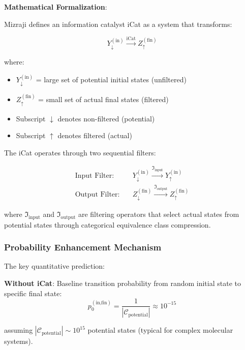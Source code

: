 \documentclass[11pt,a4paper]{article}
\begin{document}
\textbf{Mathematical Formalization}:

Mizraji defines an information catalyst iCat as a system that transforms:

\begin{equation}
Y_{\downarrow}^{(\text{in})} \xrightarrow{\text{iCat}} Z_{\uparrow}^{(\text{fin})}
\end{equation}

where:
\begin{itemize}
\item $Y_{\downarrow}^{(\text{in})}$ = large set of potential initial states (unfiltered)
\item $Z_{\uparrow}^{(\text{fin})}$ = small set of actual final states (filtered)  
\item Subscript $\downarrow$ denotes non-filtered (potential)
\item Subscript $\uparrow$ denotes filtered (actual)
\end{itemize}

The iCat operates through two sequential filters\cite{mizraji2021biological}:

\begin{align}
\text{Input Filter}: \quad & Y_{\downarrow}^{(\text{in})} \xrightarrow{\Im_{\text{input}}} Y_{\uparrow}^{(\text{in})} \\
\text{Output Filter}: \quad & Z_{\downarrow}^{(\text{fin})} \xrightarrow{\Im_{\text{output}}} Z_{\uparrow}^{(\text{fin})}
\end{align}

where $\Im_{\text{input}}$ and $\Im_{\text{output}}$ are filtering operators that select actual states from potential states through categorical equivalence class compression.

\subsubsection{Probability Enhancement Mechanism}

The key quantitative prediction\cite{mizraji2021biological}:

\textbf{Without iCat}: Baseline transition probability from random initial state to specific final state:
\begin{equation}
p_0^{(\text{in,fin})} = \frac{1}{|\mathcal{C}_{\text{potential}}|} \approx 10^{-15}
\end{equation}

assuming $|\mathcal{C}_{\text{potential}}| \sim 10^{15}$ potential states (typical for complex molecular systems).
\end{document}
